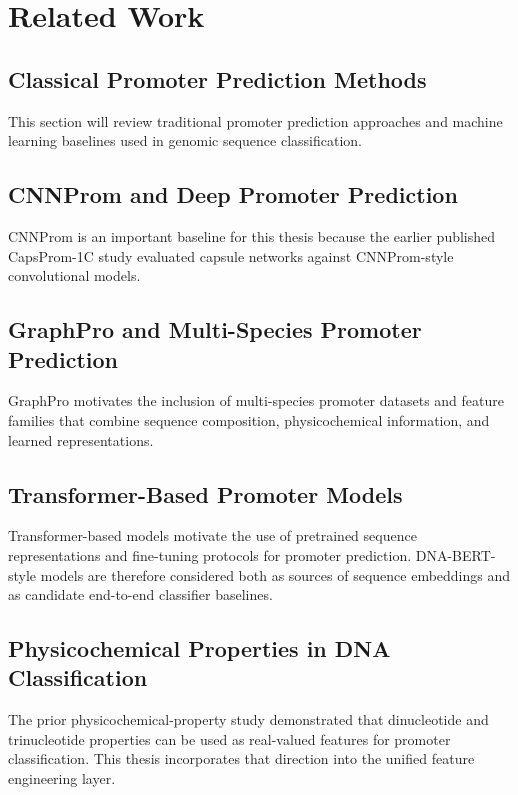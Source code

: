 \chapter{Related Work}\label{chap:related-work}

\section{Classical Promoter Prediction Methods}\label{sec:rw-classical}

This section will review traditional promoter prediction approaches and machine
learning baselines used in genomic sequence classification.

\section{CNNProm and Deep Promoter Prediction}\label{sec:rw-cnnprom}

CNNProm is an important baseline for this thesis because the earlier published
CapsProm-1C study evaluated capsule networks against CNNProm-style
convolutional models.

\section{GraphPro and Multi-Species Promoter Prediction}\label{sec:rw-graphpro}

GraphPro motivates the inclusion of multi-species promoter datasets and feature
families that combine sequence composition, physicochemical information, and
learned representations.

\section{Transformer-Based Promoter Models}\label{sec:rw-transformer-promoters}

Transformer-based models motivate the use of pretrained sequence representations
and fine-tuning protocols for promoter prediction. DNA-BERT-style models are
therefore considered both as sources of sequence embeddings and as candidate
end-to-end classifier baselines.

\section{Physicochemical Properties in DNA Classification}\label{sec:rw-physicochemical}

The prior physicochemical-property study demonstrated that dinucleotide and
trinucleotide properties can be used as real-valued features for promoter
classification. This thesis incorporates that direction into the unified feature
engineering layer.

